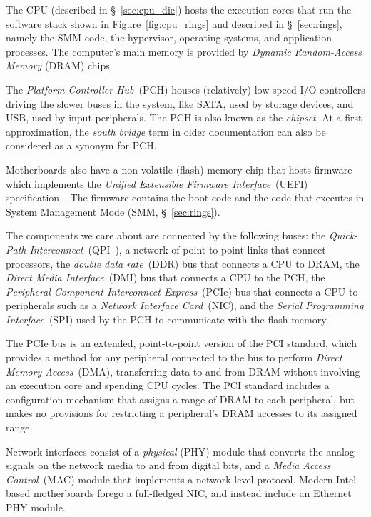 The CPU (described in \S~\ref{sec:cpu_die}) hosts the execution cores that run
the software stack shown in Figure~\ref{fig:cpu_rings} and described in
\S~\ref{sec:rings}, namely the SMM code, the hypervisor, operating systems, and
application processes. The computer's main memory is provided by
\textit{Dynamic Random-Access Memory} (DRAM) chips.

The \textit{Platform Controller Hub}~(PCH) houses (relatively) low-speed I/O
controllers driving the slower buses in the system, like SATA, used by storage
devices, and USB, used by input peripherals. The PCH is also known as the
\textit{chipset}. At a first approximation, the \textit{south bridge} term in
older documentation can also be considered as a synonym for PCH.

Motherboards also have a non-volatile (flash) memory chip that hosts firmware
which implements the \textit{Unified Extensible Firmware Interface}~(UEFI)
specification~\cite{forum2015uefi}. The firmware contains the boot code and the
code that executes in System Management Mode (SMM, \S~\ref{sec:rings}).

The components we care about are connected by the following buses: the
\textit{Quick-Path Interconnect}~(QPI~\cite{intel2009qpi}), a network of
point-to-point links that connect processors, the
\textit{double data rate}~(DDR) bus that connects a CPU to DRAM, the
\textit{Direct Media Interface}~(DMI) bus that connects a CPU to the PCH, the
\textit{Peripheral Component Interconnect Express}~(PCIe) bus that connects
a CPU to peripherals such as a \textit{Network Interface Card}~(NIC), and the
\textit {Serial Programming Interface}~(SPI) used by the PCH to communicate
with the flash memory.

The PCIe bus is an extended, point-to-point version of the PCI standard, which
provides a method for any peripheral connected to the bus to perform
\textit{Direct Memory Access}~(DMA), transferring data to and from DRAM without
involving an execution core and spending CPU cycles. The PCI standard includes
a configuration mechanism that assigns a range of DRAM to each peripheral, but
makes no provisions for restricting a peripheral's DRAM accesses to its
assigned range.

Network interfaces consist of a \textit{physical} (PHY) module that converts
the analog signals on the network media to and from digital bits, and a
\textit{Media Access Control}~(MAC) module that implements a network-level
protocol. Modern Intel-based motherboards forego a full-fledged NIC, and
instead include an Ethernet~\cite{ieee8023ethernet} PHY module.


